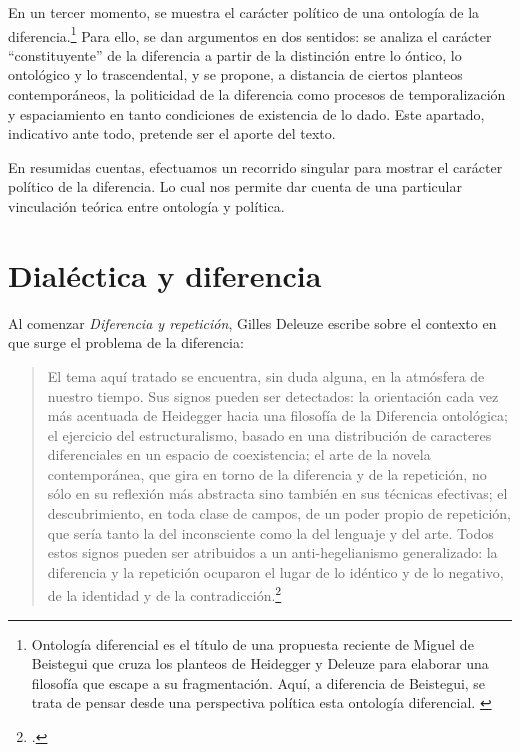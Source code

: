 En un tercer momento, se muestra el carácter político de una ontología de la diferencia.\footnote{Ontología diferencial es el título de una propuesta reciente de Miguel de Beistegui que cruza los planteos de Heidegger y Deleuze para elaborar una filosofía que escape a su fragmentación. Aquí, a diferencia de Beistegui, se trata de pensar desde una perspectiva política esta ontología diferencial. \cite[Véase][25]{@6960-BEISTEGUE2004}} Para ello, se dan argumentos en dos sentidos: se analiza el carácter \enquote{constituyente} de la diferencia a partir de la distinción entre lo óntico, lo ontológico y lo trascendental, y se propone, a distancia de ciertos planteos contemporáneos, la politicidad de la diferencia como procesos de temporalización y espaciamiento en tanto condiciones de existencia de lo dado. Este apartado, indicativo ante todo, pretende ser el aporte del texto.

En resumidas cuentas, efectuamos un recorrido singular para mostrar el carácter político de la diferencia. Lo cual nos permite dar cuenta de una particular vinculación teórica entre ontología y política.

  \section{Dialéctica y diferencia}

Al comenzar \emph{Diferencia y repetición}, Gilles Deleuze escribe sobre el contexto en que surge el problema de la diferencia:

\begin{quote}
El tema aquí tratado se encuentra, sin duda alguna, en la atmósfera de nuestro tiempo. Sus signos pueden ser detectados: la orientación cada vez más acentuada de Heidegger hacia una filosofía de la Diferencia ontológica; el ejercicio del estructuralismo, basado en una distribución de caracteres diferenciales en un espacio de coexistencia; el arte de la novela contemporánea, que gira en torno de la diferencia y de la repetición, no sólo en su reflexión más abstracta sino también en sus técnicas efectivas; el descubrimiento, en toda clase de campos, de un poder propio de repetición, que sería tanto la del inconsciente como la del lenguaje y del arte. Todos estos signos pueden ser atribuidos a un anti-hegelianismo generalizado: la diferencia y la repetición ocuparon el lugar de lo idéntico y de lo negativo, de la identidad y de la contradicción.\footcite[15]{@6961-DELEUZE2002}
\end{quote}

